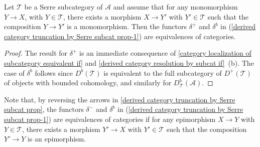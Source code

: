 \begin{theorem}\label{derived category truncation by Serre subcat prop}
Let $\mathcal{T}$ be a Serre subcategory of $\mathcal{A}$ and assume that for any monomorphism $Y\to X$, with $Y\in\mathcal{T}$, there exists a morphism $X\to Y'$ with $Y'\in\mathcal{T}$ such that the composition $Y\to Y'$ is a monomorphism. Then the functors $\delta^+$ and $\delta^b$ in (\ref{derived category truncation by Serre subcat prop-1}) are equivalences of categories.
\end{theorem}
\begin{proof}
The result for $\delta^+$ is an immediate consequence of \cref{category localization of subcategory equivalent if} and \cref{derived category resolution by subcat if}~(b). The case of $\delta^b$ follows since $D^b(\mathcal{T})$ is equivalent to the full subcategory of $D^+(\mathcal{T})$ of objects with bounded cohomology, and similarly for $D^b_\mathcal{T}(\mathcal{A})$.
\end{proof}
Note that, by reversing the arrows in \cref{derived category truncation by Serre subcat prop}, the functors $\delta^-$ and $\delta^b$ in (\ref{derived category truncation by Serre subcat prop-1}) are equivalences of categories if for any epimorphism $X\to Y$ with $Y\in\mathcal{T}$, there exists a morphism $Y'\to X$ with $Y'\in\mathcal{T}$ such that the composition $Y'\to Y$ is an epimorphism.

